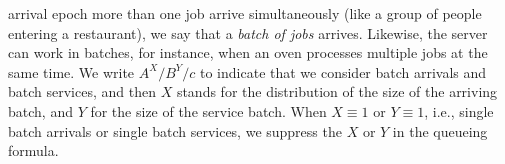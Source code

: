  arrival epoch more than one job arrive simultaneously (like a group of people entering a restaurant), we say that a \emph{batch of jobs} arrives.
Likewise, the server can work in batches, for instance, when an oven processes multiple jobs at the same time.
We write $A^X/B^Y/c$ to indicate that we consider batch arrivals and batch services, and then $X$  stands for the distribution of the size of the arriving batch, and $Y$ for the size of the service batch.
When $X\equiv 1$ or $Y \equiv 1$, i.e., single batch arrivals or single batch services, we suppress the $X$ or $Y$ in the queueing formula.



